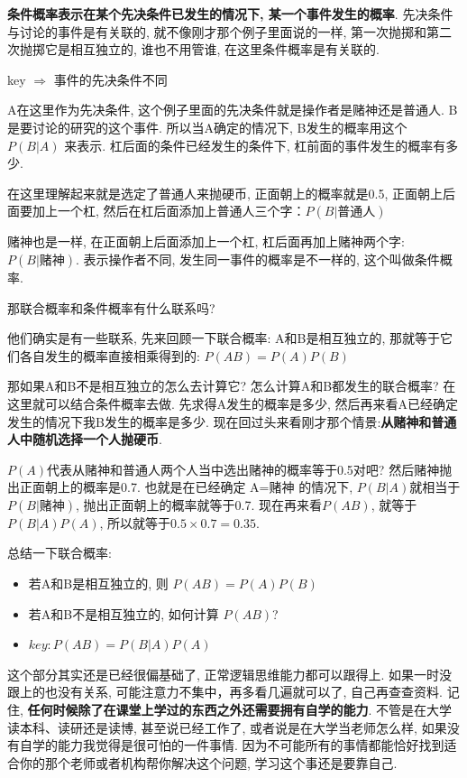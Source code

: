 \textbf{条件概率表示在某个先决条件已发生的情况下, 某一个事件发生的概率}. 先决条件与讨论的事件是有关联的, 就不像刚才那个例子里面说的一样, 第一次抛掷和第二次抛掷它是相互独立的, 谁也不用管谁, 在这里条件概率是有关联的. 

key $\Rightarrow$ 事件的先决条件不同

A在这里作为先决条件, 这个例子里面的先决条件就是操作者是赌神还是普通人. B是要讨论的研究的这个事件. 所以当A确定的情况下, B发生的概率用这个 $P(B|A)$ 来表示. 杠后面的条件已经发生的条件下, 杠前面的事件发生的概率有多少. 

在这里理解起来就是选定了普通人来抛硬币, 正面朝上的概率就是0.5, 正面朝上后面要加上一个杠, 然后在杠后面添加上普通人三个字：$P(B|\mbox{普通人})$

赌神也是一样, 在正面朝上后面添加上一个杠, 杠后面再加上赌神两个字: $P(B|\mbox{赌神})$.  表示操作者不同, 发生同一事件的概率是不一样的, 这个叫做条件概率. 

那联合概率和条件概率有什么联系吗? 

他们确实是有一些联系, 先来回顾一下联合概率: A和B是相互独立的, 那就等于它们各自发生的概率直接相乘得到的: $P(AB) = P(A)P(B)$

那如果A和B不是相互独立的怎么去计算它? 怎么计算A和B都发生的联合概率? 在这里就可以结合条件概率去做. 先求得A发生的概率是多少, 然后再来看A已经确定发生的情况下我B发生的概率是多少. 现在回过头来看刚才那个情景:\textbf{从赌神和普通人中随机选择一个人抛硬币}. 

$P(A)$代表从赌神和普通人两个人当中选出赌神的概率等于0.5对吧? 然后赌神抛出正面朝上的概率是0.7.  也就是在已经确定 A=赌神 的情况下, $P(B|A)$就相当于$P(B|\mbox{赌神})$, 抛出正面朝上的概率就等于0.7. 现在再来看$P(AB)$, 就等于$P(B|A)P(A)$, 所以就等于$0.5 \times 0.7=0.35$. 

总结一下联合概率:
\begin{itemize}
  \item 若A和B是相互独立的, 则 $P(AB) = P(A)P(B)$ 
  \item 若A和B不是相互独立的, 如何计算 $P(AB)$? 
  \item $key: P(AB) = P(B|A)P(A)$
\end{itemize}

这个部分其实还是已经很偏基础了, 正常逻辑思维能力都可以跟得上. 如果一时没跟上的也没有关系, 可能注意力不集中，再多看几遍就可以了, 自己再查查资料. 记住, \textbf{任何时候除了在课堂上学过的东西之外还需要拥有自学的能力}. 不管是在大学读本科、读研还是读博, 甚至说已经工作了, 或者说是在大学当老师怎么样, 如果没有自学的能力我觉得是很可怕的一件事情. 因为不可能所有的事情都能恰好找到适合你的那个老师或者机构帮你解决这个问题, 学习这个事还是要靠自己. 

